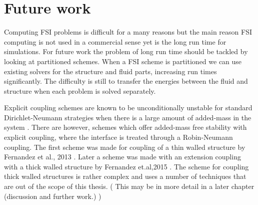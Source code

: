 \section{Future work}
Computing FSI problems is difficult for a many reasons but the main reason FSI computing is not used in a commercial sense yet is the long run time for simulations. For future work the problem of long run time should be tackled by looking at partitioned schemes. When a FSI scheme is partitioned we can use existing solvers for the structure and fluid parts, increasing run times significantly. The difficulty is still to transfer the energies between the fluid and structure when each problem is solved separately.  

Explicit coupling schemes are known to be unconditionally unstable for standard Dirichlet-Neumann strategies when there is a large amount of added-mass in the system \cite{Fernandez2015, VanBrummelen2009}. There are however, schemes which offer added-mass free stability with explicit coupling, where the interface is treated through a Robin-Neumann coupling. The first scheme was made for coupling of a thin walled structure by Fernandez et al., 2013 \cite{Fernandez2013}. Later a scheme was made with an extension coupling with a thick walled structure by Fernandez et.al,2015 \cite{Fernandez2015}. The scheme for coupling thick walled structures is rather complex and uses a number of techniques that are out of the scope of this thesis. ( This may be in more detail in a later chapter (discussion and further work.) ) \newline